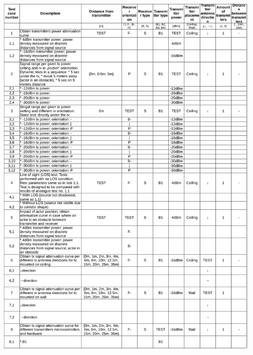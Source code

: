 \documentclass[../main.tex]{subfiles}
\begin{document}
\begin{table}[ht]
\includegraphics[width=\textwidth, keepaspectratio]{tables/test_parameters_p1.pdf}
\centering
\end{table}
\end{document}
